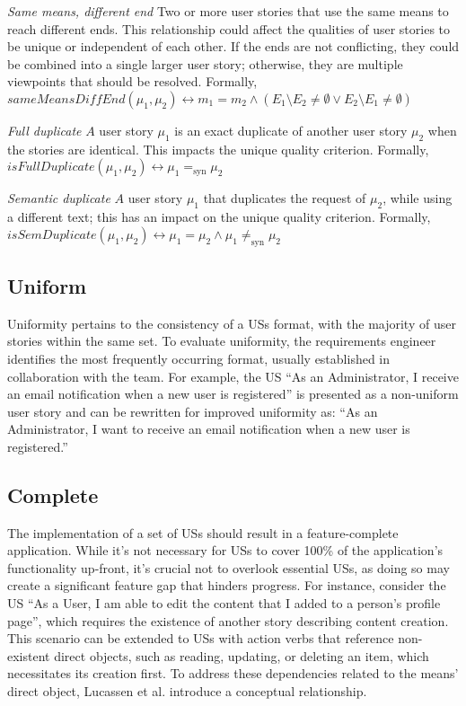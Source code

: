 \begin{definition}
\emph{Same means, different end} Two or more user stories that use the same means to reach different ends. This relationship could affect the qualities of user stories to be unique or independent of each other. If the ends are not conflicting, they could be combined into a single larger user story; otherwise, they are multiple viewpoints that should be resolved. Formally,\\ 
$sameMeansDiffEnd(\mu_1, \mu_2) \leftrightarrow m_1 = m_2 \wedge (E_1 \setminus E_2 \neq \emptyset \vee E_2 \setminus E_1 \neq \emptyset )$
\end{definition}
\begin{definition}
\emph{Full duplicate} $A$ user story $\mu_1$ is an exact duplicate of another user story  $\mu_2$ when the stories are identical. This impacts the unique quality criterion. Formally,\\ 
$isFullDuplicate(\mu_1,\mu_2) \leftrightarrow \mu_1 =_{\text{syn}} \mu_2$
\end{definition}
\begin{definition}
\emph{Semantic duplicate} $A$ user story $\mu_1$ that duplicates the request of $\mu_2$, while using a different text; this has an impact on the unique quality criterion. Formally,\\ 
$isSemDuplicate(\mu_1,\mu_2) \leftrightarrow \mu_1 = \mu_2 \wedge \mu_1 \neq _{\text{syn}} \mu_2$
\end{definition}
\subsection*{\normalsize{Uniform}}
Uniformity pertains to the consistency of a USs format, with the majority of user stories within the same set. To evaluate uniformity, the requirements engineer identifies the most frequently occurring format, usually established in collaboration with the team. For example, the US \enquote{As an Administrator, I receive an email notification when a new user is registered} is presented as a non-uniform user story and can be rewritten for improved uniformity as: \enquote{As an Administrator, I want to receive an email notification when a new user is registered.}
\subsection*{\normalsize{Complete}}
The implementation of a set of USs should result in a feature-complete application. While it's not necessary for USs to cover 100\% of the application's functionality up-front, it's crucial not to overlook essential USs, as doing so may create a significant feature gap that hinders progress. For instance, consider the US \enquote{As a User, I am able to edit the content that I added to a person’s profile page}, which requires the existence of another story describing content creation. This scenario can be extended to USs with action verbs that reference non-existent direct objects, such as reading, updating, or deleting an item, which necessitates its creation first. To address these dependencies related to the means' direct object, Lucassen et al. introduce a conceptual relationship. 
 
